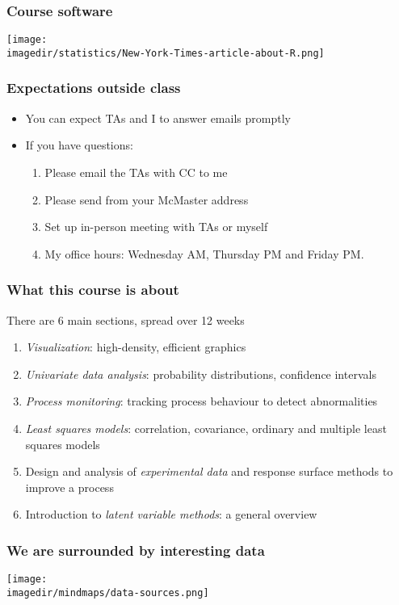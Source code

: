 \begin{frame}\frametitle{Course software}	
	\texttt{[image: \\imagedir/statistics/New-York-Times-article-about-R.png]}
\end{frame}

\begin{frame}\frametitle{Expectations outside class}
	\begin{itemize}
		\item	You can expect TAs and I to answer emails promptly 
		\item	If you have questions: 
		\begin{enumerate}
			\item	Please email the TAs with CC to me \hfill {\tiny{\color{myOrange}{$\longleftarrow$ hopefully this solves your problem}}}
			\item	Please send from your McMaster address
			\item	Set up in-person meeting with TAs or myself 
			\item	My office hours: Wednesday AM, Thursday PM and Friday PM.
		\end{enumerate}
	\end{itemize}
\end{frame}

\begin{frame}\frametitle{What this course is about}
	There are 6 main sections, spread over 12 weeks
	\begin{enumerate}
		\item	\emph{Visualization}: high-density, efficient graphics 
		\item	\emph{Univariate data analysis}: probability distributions, confidence intervals 
		\item	\emph{Process monitoring}: tracking process behaviour to detect abnormalities 
		\item	\emph{Least squares models}: correlation, covariance, ordinary and multiple least squares models 
		\item	Design and analysis of \emph{experimental data} and response surface methods to improve a process 
		\item	Introduction to \emph{latent variable methods}: a general overview 
	\end{enumerate}
\end{frame}

\begin{frame}\frametitle{We are surrounded by interesting data}
	\begin{center}
		\texttt{[image: \\imagedir/mindmaps/data-sources.png]}
	\end{center}
\end{frame}

